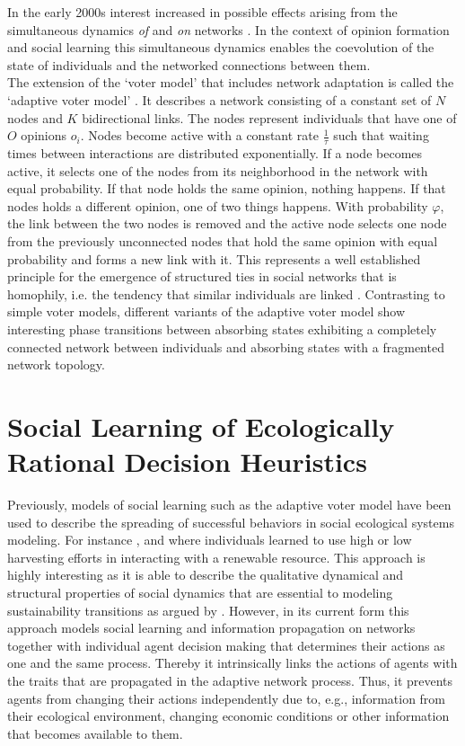 In the early 2000s interest increased in possible effects arising from the simultaneous dynamics \emph{of} and \emph{on} networks \citep[for a review see][]{Gross2008}. In the context of opinion formation and social learning this simultaneous dynamics enables the coevolution of the state of individuals and the networked connections between them.\\

The extension of the `voter model' that includes network adaptation is called the `adaptive voter model' \citep{Holme2006a, Bohme2011, Rogers2013, Klamser2016, Min2017}. It describes a network consisting of a constant set of $N$ nodes and $K$ bidirectional links. The nodes represent individuals that have one of $O$ opinions $o_i$. Nodes become active with a constant rate $\frac{1}{\tau}$ such that waiting times between interactions are distributed exponentially. If a node becomes active, it selects one of the nodes from its neighborhood in the network with equal probability. If that node holds the same opinion, nothing happens. If that nodes holds a different opinion, one of two things happens. With probability $\varphi$, the link between the two nodes is removed and the active node selects one node from the previously unconnected nodes that hold the same opinion with equal probability and forms a new link with it. This represents a well established principle for the emergence of structured ties in social networks that is homophily, i.e. the tendency that similar individuals are linked \citep{McPherson2007, Centola2007, Centola2011}.
Contrasting to simple voter models, different variants of the adaptive voter model show interesting phase transitions between absorbing states exhibiting a completely connected network between individuals and absorbing states with a fragmented network topology.

\section{Social Learning of Ecologically Rational Decision Heuristics}
\label{sec:intro_learning_heuristics}

Previously, models of social learning such as the adaptive voter model have been used to describe the spreading of successful behaviors in social ecological systems modeling. For instance \cite{Wiedermann2015}, \cite{Barfuss2017} and \cite{Geier2019} where individuals learned to use high or low harvesting efforts in interacting with a renewable resource. This approach is highly interesting as it is able to describe the qualitative dynamical and structural properties of social dynamics that are essential to modeling sustainability transitions as argued by \cite{Lade2017}.
However, in its current form this approach models social learning and information propagation on networks together with individual agent decision making that determines their actions as one and the same process. Thereby it intrinsically links the actions of agents with the traits that are propagated in the adaptive network process. Thus, it prevents agents from changing their actions independently due to, e.g., information from their ecological environment, changing economic conditions or other information that becomes available to them. 

